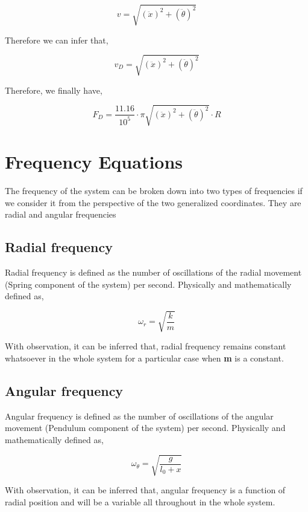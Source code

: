         $$v = \sqrt{(\ddot{x})^2 + (\ddot{\theta})^2}$$
        
    {Therefore we can infer that,}
        
        $$v_D = \sqrt{(\ddot{x})^2 + (\ddot{\theta})^2}$$
            
    {Therefore, we finally have,}
            
        $$F_D = \frac{11.16}{10^{5}}\cdot\pi\sqrt{(\ddot{x})^2 + (\ddot{\theta})^2}\cdot R$$
            
\section{{Frequency Equations}}
            
    {The frequency of the system can be broken down into two types of frequencies if we consider it from the perspective of the two generalized coordinates. They are radial and angular frequencies}
            
    \subsection{{Radial frequency}}
                
        {Radial frequency is defined as the number of oscillations of the radial movement (Spring component of the system) per second. Physically and mathematically defined as,}
                
            $$\omega_r = \sqrt{\frac{k}{m}}$$
                
        {With observation, it can be inferred that, radial frequency remains constant whatsoever in the whole system for a particular case when \textbf{m} is a constant.}
            
    \subsection{{Angular frequency}}
                
        {Angular frequency is defined as the number of oscillations of the angular movement (Pendulum component of the system) per second. Physically and mathematically defined as,}
                
            $$\omega_\theta = \sqrt{\frac{g}{l_0 + x}}$$
                
        {With observation, it can be inferred that, angular frequency is a function of radial position and will be a variable all throughout in the whole system.}
                
